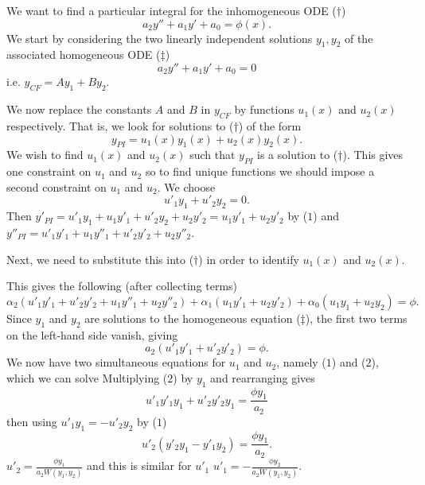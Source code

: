 \documentclass[10pt, a4paper]{article}
\begin{document}
We want to find a particular integral for the inhomogeneous ODE ($\dagger$)
\[
a_2y'' + a_1y' + a_0 = \phi(x).
\]
We start by considering the two linearly independent solutions $y_1, y_2$ of the associated homogeneous ODE ($\ddagger$)
\[
a_2y'' + a_1y' + a_0 = 0
\]
i.e. $y_{CF} = Ay_1 + By_2$.

We now replace the constants $A$ and $B$ in $y_{CF}$ by functions $u_1(x)$ and $u_2(x)$ respectively.
That is,
we look for solutions to ($\dagger$) of the form
\[
y_{PI} = u_1(x)y_1(x) + u_2(x)y_2(x).
\]
We wish to find $u_1(x)$ and $u_2(x)$ such that $y_{PI}$ is a solution to ($\dagger$).
This gives one constraint on $u_1$ and $u_2$ so to find unique functions we should impose a second constraint on $u_1$ and $u_2$.
We choose
\begin{equation}\tag{$1$}
    u'_1y_1 + u'_2y_2 = 0.
\end{equation}
Then $y'_{PI} = u'_1y_1 + u_1y'_1 + u'_2y_2 + u_2y'_2 = u_1y'_1 + u_2y'_2$ by ($1$) and $y''_{PI} = u'_1y'_1 + u_1y''_1 + u'_2y'_2 + u_2y''_2$.

Next,
we need to substitute this into ($\dagger$) in order to identify $u_1(x)$ and $u_2(x)$.

This gives the following
(after collecting terms)
\[
\alpha_2(u'_1y'_1 + u'_2y'_2 + u_1y''_1 + u_2y''_2) + \alpha_1(u_1y'_1 + u_2y'_2) + \alpha_0(u_1y_1 + u_2y_2) = \phi.
\]
Since $y_1$ and $y_2$ are solutions to the homogeneous equation ($\ddagger$),
the first two terms on the left-hand side vanish,
giving
\begin{equation}\tag{$2$}
    a_2(u'_1y'_1 + u'_2y'_2) = \phi.
\end{equation}
We now have two simultaneous equations for $u_1$ and $u_2$,
namely ($1$) and ($2$),
which we can solve
Multiplying ($2$) by $y_1$ and rearranging gives
\[
u'_1y'_1y_1 + u'_2y'_2y_1 = \frac{\phi y_1}{a_2}
\]
then using $u'_1y_1 = -u'_2y_2$ by ($1$)
\[
u'_2(y'_2y_1 - y'_1y_2) = \frac{\phi y_1}{a_2}.
\]
$u'_2 = \frac{\phi y_1}{a_2W(y_1, y_2)}$
and this is similar for $u'_1$
$u'_1 = -\frac{\phi y_2}{a_2W(y_1, y_2)}$.
\end{document}
